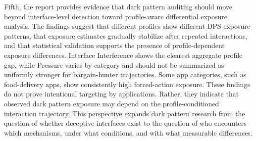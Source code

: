 Fifth, the report provides evidence that dark pattern auditing should move beyond interface-level detection toward profile-aware differential exposure analysis. The findings suggest that different profiles show different DPS exposure patterns, that exposure estimates gradually stabilize after repeated interactions, and that statistical validation supports the presence of profile-dependent exposure differences. Interface Interference shows the clearest aggregate profile gap, while Pressure varies by category and should not be summarized as uniformly stronger for bargain-hunter trajectories. Some app categories, such as food-delivery apps, show consistently high forced-action exposure. These findings do not prove intentional targeting by applications. Rather, they indicate that observed dark pattern exposure may depend on the profile-conditioned interaction trajectory. This perspective expands dark pattern research from the question of whether deceptive interfaces exist to the question of who encounters which mechanisms, under what conditions, and with what measurable differences.
